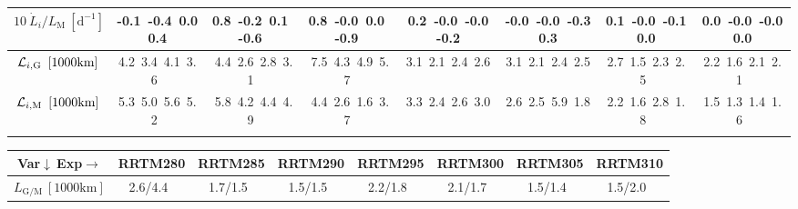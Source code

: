 \begin{table}[H]
{\begin{centering}
\begin{tabular}{|c|c|c|c|c|c|c|c|}
\hline
$10\ \dot{L}_{i}/L_{\mathrm{M}}\ \left[\mathrm{d^{-1}}\right]$ & \textcolor{C1}{-0.1}\ \textcolor{C2}{-0.4}\ \textcolor{C3}{0.0}\ \textcolor{C4}{0.4}\  & \textcolor{C1}{0.8}\ \textcolor{C2}{-0.2}\ \textcolor{C3}{0.1}\ \textcolor{C4}{-0.6}\  & \textcolor{C1}{0.8}\ \textcolor{C2}{-0.0}\ \textcolor{C3}{0.0}\ \textcolor{C4}{-0.9}\  & \textcolor{C1}{0.2}\ \textcolor{C2}{-0.0}\ \textcolor{C3}{-0.0}\ \textcolor{C4}{-0.2}\  & \textcolor{C1}{-0.0}\ \textcolor{C2}{-0.0}\ \textcolor{C3}{-0.3}\ \textcolor{C4}{0.3}\  & \textcolor{C1}{0.1}\ \textcolor{C2}{-0.0}\ \textcolor{C3}{-0.1}\ \textcolor{C4}{0.0}\  & \textcolor{C1}{0.0}\ \textcolor{C2}{-0.0}\ \textcolor{C3}{-0.0}\ \textcolor{C4}{0.0}\  \tabularnewline
\hline
${\cal L}_{i,\mathrm{G}}\ \left[1000\mathrm{km}\right]$ & \textcolor{C1}{4.2}\ \textcolor{C2}{3.4}\ \textcolor{C3}{4.1}\ \textcolor{C4}{3.6}\  & \textcolor{C1}{4.4}\ \textcolor{C2}{2.6}\ \textcolor{C3}{2.8}\ \textcolor{C4}{3.1}\  & \textcolor{C1}{7.5}\ \textcolor{C2}{4.3}\ \textcolor{C3}{4.9}\ \textcolor{C4}{5.7}\  & \textcolor{C1}{3.1}\ \textcolor{C2}{2.1}\ \textcolor{C3}{2.4}\ \textcolor{C4}{2.6}\  & \textcolor{C1}{3.1}\ \textcolor{C2}{2.1}\ \textcolor{C3}{2.4}\ \textcolor{C4}{2.5}\  & \textcolor{C1}{2.7}\ \textcolor{C2}{1.5}\ \textcolor{C3}{2.3}\ \textcolor{C4}{2.5}\  & \textcolor{C1}{2.2}\ \textcolor{C2}{1.6}\ \textcolor{C3}{2.1}\ \textcolor{C4}{2.1}\  \tabularnewline
\hline
${\cal L}_{i,\mathrm{M}}\ \left[1000\mathrm{km}\right]$ & \textcolor{C1}{5.3}\ \textcolor{C2}{5.0}\ \textcolor{C3}{5.6}\ \textcolor{C4}{5.2}\  & \textcolor{C1}{5.8}\ \textcolor{C2}{4.2}\ \textcolor{C3}{4.4}\ \textcolor{C4}{4.9}\  & \textcolor{C1}{4.4}\ \textcolor{C2}{2.6}\ \textcolor{C3}{1.6}\ \textcolor{C4}{3.7}\  & \textcolor{C1}{3.3}\ \textcolor{C2}{2.4}\ \textcolor{C3}{2.6}\ \textcolor{C4}{3.0}\  & \textcolor{C1}{2.6}\ \textcolor{C2}{2.5}\ \textcolor{C3}{5.9}\ \textcolor{C4}{1.8}\  & \textcolor{C1}{2.2}\ \textcolor{C2}{1.6}\ \textcolor{C3}{2.8}\ \textcolor{C4}{1.8}\  & \textcolor{C1}{1.5}\ \textcolor{C2}{1.3}\ \textcolor{C3}{1.4}\ \textcolor{C4}{1.6}\  \tabularnewline
\hline
 &  &  &  &  &  &  & \tabularnewline
\hline
\end{tabular}
\begin{tabular}{|c|c|c|c|c|c|c|c|}
\hline
Var$\downarrow\ $Exp$\rightarrow$ & RRTM280 & RRTM285 & RRTM290 & RRTM295 & RRTM300 & RRTM305 & RRTM310 \tabularnewline
\hline
\hline
$L_{\mathrm{G/M}}\ \left[1000\mathrm{km}\right]$ & 2.6/4.4\ & 1.7/1.5\ & 1.5/1.5\ & 2.2/1.8\ & 2.1/1.7\ & 1.5/1.4\ & 1.5/2.0\ \tabularnewline
\hline

\end{tabular}
\end{centering}}
\end{table}
